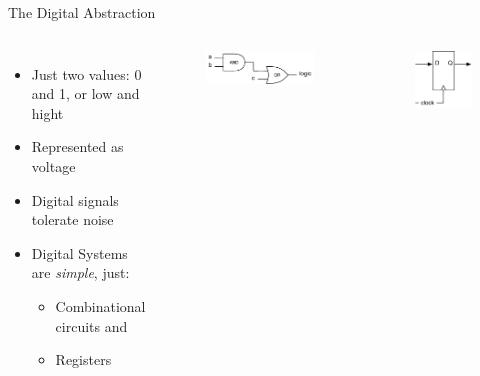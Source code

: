 \documentclass[xcolor=pdflatex,dvipsnames,table]{beamer}
\newcommand{\scale}{0.7}
\begin{document}
\begin{frame}[fragile]{The Digital Abstraction}
\begin{columns}
 
\begin{itemize}
\item Just two values: 0 and 1, or low and hight
\item Represented as voltage
\item Digital signals tolerate noise
\item Digital Systems are \emph{simple}, just:
\begin{itemize}
\item Combinational circuits and
\item Registers
\end{itemize}
\end{itemize}
 
\begin{figure}
  \includegraphics[scale=\scale]{../figures/logic}
\end{figure}
\begin{figure}
  \includegraphics[scale=\scale]{../figures/register}
\end{figure}
\end{columns}

\end{frame}
\end{document}

